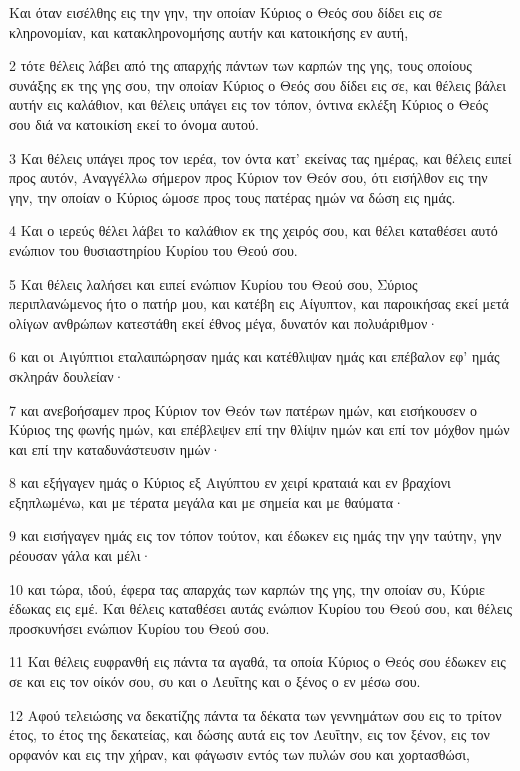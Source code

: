 \par Και όταν εισέλθης εις την γην, την οποίαν Κύριος ο Θεός σου δίδει εις σε κληρονομίαν, και κατακληρονομήσης αυτήν και κατοικήσης εν αυτή,
\par 2 τότε θέλεις λάβει από της απαρχής πάντων των καρπών της γης, τους οποίους συνάξης εκ της γης σου, την οποίαν Κύριος ο Θεός σου δίδει εις σε, και θέλεις βάλει αυτήν εις καλάθιον, και θέλεις υπάγει εις τον τόπον, όντινα εκλέξη Κύριος ο Θεός σου διά να κατοικίση εκεί το όνομα αυτού.
\par 3 Και θέλεις υπάγει προς τον ιερέα, τον όντα κατ' εκείνας τας ημέρας, και θέλεις ειπεί προς αυτόν, Αναγγέλλω σήμερον προς Κύριον τον Θεόν σου, ότι εισήλθον εις την γην, την οποίαν ο Κύριος ώμοσε προς τους πατέρας ημών να δώση εις ημάς.
\par 4 Και ο ιερεύς θέλει λάβει το καλάθιον εκ της χειρός σου, και θέλει καταθέσει αυτό ενώπιον του θυσιαστηρίου Κυρίου του Θεού σου.
\par 5 Και θέλεις λαλήσει και ειπεί ενώπιον Κυρίου του Θεού σου, Σύριος περιπλανώμενος ήτο ο πατήρ μου, και κατέβη εις Αίγυπτον, και παροικήσας εκεί μετά ολίγων ανθρώπων κατεστάθη εκεί έθνος μέγα, δυνατόν και πολυάριθμον·
\par 6 και οι Αιγύπτιοι εταλαιπώρησαν ημάς και κατέθλιψαν ημάς και επέβαλον εφ' ημάς σκληράν δουλείαν·
\par 7 και ανεβοήσαμεν προς Κύριον τον Θεόν των πατέρων ημών, και εισήκουσεν ο Κύριος της φωνής ημών, και επέβλεψεν επί την θλίψιν ημών και επί τον μόχθον ημών και επί την καταδυνάστευσιν ημών·
\par 8 και εξήγαγεν ημάς ο Κύριος εξ Αιγύπτου εν χειρί κραταιά και εν βραχίονι εξηπλωμένω, και με τέρατα μεγάλα και με σημεία και με θαύματα·
\par 9 και εισήγαγεν ημάς εις τον τόπον τούτον, και έδωκεν εις ημάς την γην ταύτην, γην ρέουσαν γάλα και μέλι·
\par 10 και τώρα, ιδού, έφερα τας απαρχάς των καρπών της γης, την οποίαν συ, Κύριε έδωκας εις εμέ. Και θέλεις καταθέσει αυτάς ενώπιον Κυρίου του Θεού σου, και θέλεις προσκυνήσει ενώπιον Κυρίου του Θεού σου.
\par 11 Και θέλεις ευφρανθή εις πάντα τα αγαθά, τα οποία Κύριος ο Θεός σου έδωκεν εις σε και εις τον οίκόν σου, συ και ο Λευΐτης και ο ξένος ο εν μέσω σου.
\par 12 Αφού τελειώσης να δεκατίζης πάντα τα δέκατα των γεννημάτων σου εις το τρίτον έτος, το έτος της δεκατείας, και δώσης αυτά εις τον Λευΐτην, εις τον ξένον, εις τον ορφανόν και εις την χήραν, και φάγωσιν εντός των πυλών σου και χορτασθώσι,
